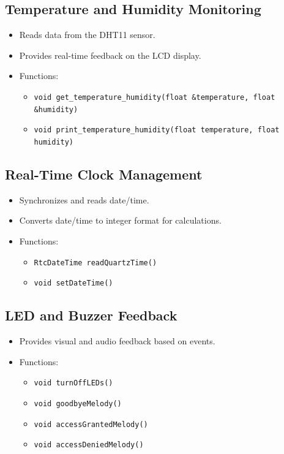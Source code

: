\documentclass[a4paper,12pt]{report}
\begin{document}
\subsection{Temperature and Humidity Monitoring}
\begin{itemize}
    \item Reads data from the DHT11 sensor.
    \item Provides real-time feedback on the LCD display.
    \item Functions:
    \begin{itemize}
        \item \texttt{void get\_temperature\_humidity(float \&temperature, float \&humidity)}
        \item \texttt{void print\_temperature\_humidity(float temperature, float humidity)}
    \end{itemize}
\end{itemize}

\subsection{Real-Time Clock Management}
\begin{itemize}
    \item Synchronizes and reads date/time.
    \item Converts date/time to integer format for calculations.
    \item Functions:
    \begin{itemize}
        \item \texttt{RtcDateTime readQuartzTime()}
        \item \texttt{void setDateTime()}
    \end{itemize}
\end{itemize}

\subsection{LED and Buzzer Feedback}
\begin{itemize}
    \item Provides visual and audio feedback based on events.
    \item Functions:
    \begin{itemize}
        \item \texttt{void turnOffLEDs()}
        \item \texttt{void goodbyeMelody()}
        \item \texttt{void accessGrantedMelody()}
        \item \texttt{void accessDeniedMelody()}
    \end{itemize}
\end{itemize}
\end{document}
